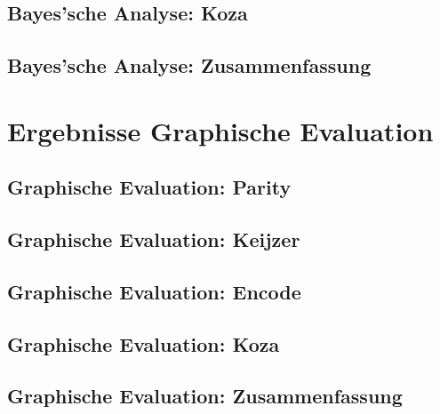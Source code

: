 \subsection{Bayes'sche Analyse: Koza}
\label{subsec:bayesKoza}



\subsection{Bayes'sche Analyse: Zusammenfassung}
\label{subsec:bayesZusammenfassung}

\section{Ergebnisse Graphische Evaluation}
\label{sec:ergebnissePlots}

\subsection{Graphische Evaluation: Parity}
\label{subsec:plotsParity}

\subsection{Graphische Evaluation: Keijzer}
\label{subsec:plotsKeijzer}

\subsection{Graphische Evaluation: Encode}
\label{subsec:plotsEncode}

\subsection{Graphische Evaluation: Koza}
\label{subsec:plotsKoza}

\subsection{Graphische Evaluation: Zusammenfassung}
\label{subsec:plotsZusammenfassung}
